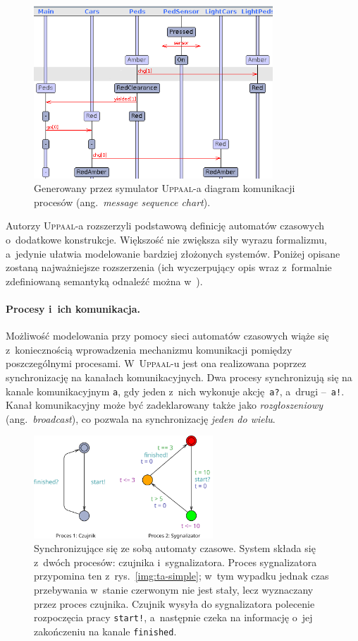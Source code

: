 \documentclass{pracamgr}
\newcommand{\ang}[1]{(ang.~\emph{#1})}
\newcommand{\imgr}[1]{rys.~\ref{#1}}
\newcommand{\upp}{\textsc{Uppaal}}
\theoremstyle{plain}
\begin{document}
\begin{figure}
  \centering
  \includegraphics[width=0.8\textwidth]{img/uppaal-msc.png}
  \caption{Generowany przez symulator \upp-a diagram komunikacji
    procesów \ang{message sequence chart}.}
  \label{img:uppaal-msc}
\end{figure}

Autorzy \upp-a rozszerzyli podstawową definicję automatów czasowych
o~dodatkowe konstrukcje. Większość nie zwiększa siły
wyrazu formalizmu, a~jedynie ułatwia modelowanie bardziej złożonych
systemów.  Poniżej opisane zostaną najważniejsze rozszerzenia
(ich wyczerpujący opis wraz z~formalnie zdefiniowaną semantyką
odnaleźć można w~\cite{by-lncs04}).
\paragraph{Procesy i~ich komunikacja.} Możliwość modelowania przy
pomocy sieci automatów czasowych wiąże się z~koniecznością
wprowadzenia mechanizmu komunikacji pomiędzy poszczególnymi
procesami. W~\upp-u jest ona realizowana poprzez synchronizację na
kanałach komunikacyjnych. Dwa procesy synchronizują się na kanale
komunikacyjnym \texttt{a}, gdy jeden z~nich wykonuje
akcję~\texttt{a?}, a~drugi --~\texttt{a!}. Kanał komunikacyjny może
być zadeklarowany także jako \emph{rozgłoszeniowy} \ang{broadcast}, co
pozwala na synchronizację \emph{jeden do wielu}.
\begin{figure}
  \includegraphics[width=0.6\textwidth]{img/ta-communication}
  \caption[Synchronizujące się ze sobą automaty czasowe.]
  {Synchronizujące się ze sobą automaty czasowe. System składa się
    z~dwóch procesów: czujnika i~sygnalizatora. Proces sygnalizatora
    przypomina ten z~\imgr{img:ta-simple}; w~tym wypadku jednak czas
    przebywania w~stanie czerwonym nie jest stały, lecz wyznaczany
    przez proces czujnika. Czujnik wysyła do sygnalizatora polecenie
    rozpoczęcia pracy \texttt{start!}, a~następnie czeka na informację
    o~jej zakończeniu na kanale \texttt{finished}.}
\end{figure}
\end{document}
